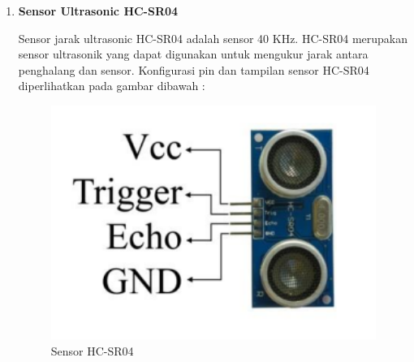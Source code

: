 \begin{enumerate}
\item \textbf{Sensor Ultrasonic HC-SR04}
\par Sensor jarak ultrasonic HC-SR04 adalah sensor 40 KHz. HC-SR04 merupakan sensor ultrasonik yang dapat digunakan untuk mengukur jarak antara penghalang dan sensor. Konfigurasi pin dan tampilan sensor HC-SR04 diperlihatkan pada gambar dibawah :
\begin{figure}[H]
\centering
\includegraphics[width=1\textwidth]{figures/sensor2.png}
\caption{Sensor HC-SR04}
\label{print}
\end{figure}


\end{enumerate}
